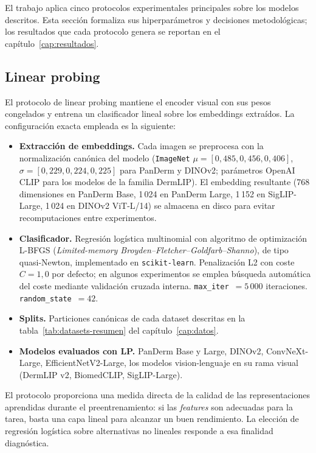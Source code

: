 El trabajo aplica cinco protocolos experimentales principales sobre
los modelos descritos. Esta sección formaliza sus hiperparámetros y
decisiones metodológicas; los resultados que cada protocolo genera
se reportan en el capítulo~\ref{cap:resultados}.

\subsection{Linear probing}
\label{sec:lp-protocol}

El protocolo de linear probing mantiene el encoder visual con sus
pesos congelados y entrena un clasificador lineal sobre los
embeddings extraídos. La configuración exacta empleada es la
siguiente:

\begin{itemize}
\item \textbf{Extracción de embeddings.} Cada imagen se preprocesa
con la normalización canónica del modelo (\texttt{ImageNet}
$\mu=[0{,}485, 0{,}456, 0{,}406]$,
$\sigma=[0{,}229, 0{,}224, 0{,}225]$ para PanDerm y DINOv2;
parámetros OpenAI CLIP para los modelos de la familia DermLIP).
El embedding resultante (768 dimensiones en PanDerm Base, 1\,024 en
PanDerm Large, 1\,152 en SigLIP-Large, 1\,024 en DINOv2 ViT-L/14)
se almacena en disco para evitar recomputaciones entre experimentos.

\item \textbf{Clasificador.} Regresión logística multinomial con
algoritmo de optimización L-BFGS (\emph{Limited-memory
Broyden--Fletcher--Goldfarb--Shanno}), de tipo quasi-Newton,
implementado en \texttt{scikit-learn}. Penalización L2 con coste
$C=1{,}0$ por defecto; en algunos experimentos se emplea búsqueda
automática del coste mediante validación cruzada interna.
\texttt{max\_iter}~$=5\,000$ iteraciones.
\texttt{random\_state}~$=42$.

\item \textbf{Splits.} Particiones canónicas de cada dataset
descritas en la tabla~\ref{tab:datasets-resumen} del
capítulo~\ref{cap:datos}.

\item \textbf{Modelos evaluados con LP.} PanDerm Base y Large,
DINOv2, ConvNeXt-Large, EfficientNetV2-Large, los modelos
vision-lenguaje en su rama visual (DermLIP v2, BiomedCLIP,
SigLIP-Large).
\end{itemize}

El protocolo proporciona una medida directa de la calidad de las
representaciones aprendidas durante el preentrenamiento: si las
\emph{features} son adecuadas para la tarea, basta una capa lineal
para alcanzar un buen rendimiento. La elección de regresión
logística sobre alternativas no lineales responde a esa finalidad
diagnóstica.

